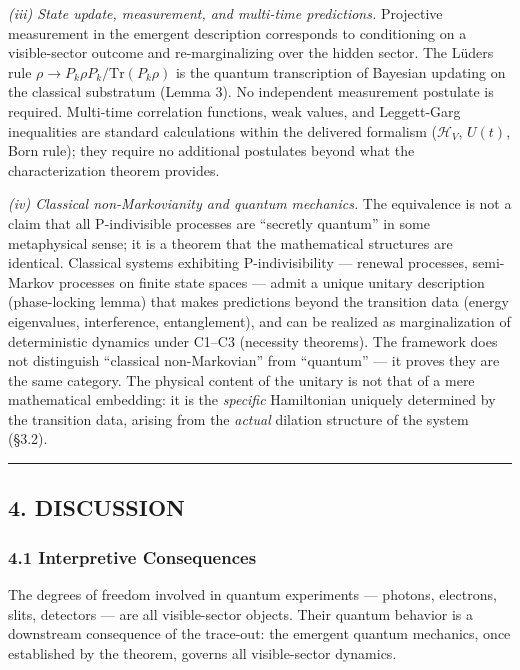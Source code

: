 \documentclass[
]{article}
\begin{document}
\emph{(iii) State update, measurement, and multi-time predictions.}
Projective measurement in the emergent description corresponds to
conditioning on a visible-sector outcome and re-marginalizing over the
hidden sector. The Lüders rule
\(\rho \to P_k \rho P_k / \text{Tr}(P_k \rho)\) is the quantum
transcription of Bayesian updating on the classical substratum (Lemma
3). No independent measurement postulate is required. Multi-time
correlation functions, weak values, and Leggett-Garg inequalities are
standard calculations within the delivered formalism (\(\mathcal{H}_V\),
\(U(t)\), Born rule); they require no additional postulates beyond what
the characterization theorem provides.

\emph{(iv) Classical non-Markovianity and quantum mechanics.} The
equivalence is not a claim that all P-indivisible processes are
``secretly quantum'' in some metaphysical sense; it is a theorem that
the mathematical structures are identical. Classical systems exhibiting
P-indivisibility --- renewal processes, semi-Markov processes on finite
state spaces --- admit a unique unitary description (phase-locking
lemma) that makes predictions beyond the transition data (energy
eigenvalues, interference, entanglement), and can be realized as
marginalization of deterministic dynamics under C1--C3 (necessity
theorems). The framework does not distinguish ``classical
non-Markovian'' from ``quantum'' --- it proves they are the same
category. The physical content of the unitary is not that of a mere
mathematical embedding: it is the \emph{specific} Hamiltonian uniquely
determined by the transition data, arising from the \emph{actual}
dilation structure of the system (§3.2).

\begin{center}\rule{0.5\linewidth}{0.5pt}\end{center}

\hypertarget{discussion}{%
\subsection{4. DISCUSSION}\label{discussion}}

\hypertarget{interpretive-consequences}{%
\subsubsection{4.1 Interpretive
Consequences}\label{interpretive-consequences}}

The degrees of freedom involved in quantum experiments --- photons,
electrons, slits, detectors --- are all visible-sector objects. Their
quantum behavior is a downstream consequence of the trace-out: the
emergent quantum mechanics, once established by the theorem, governs all
visible-sector dynamics.
\end{document}
